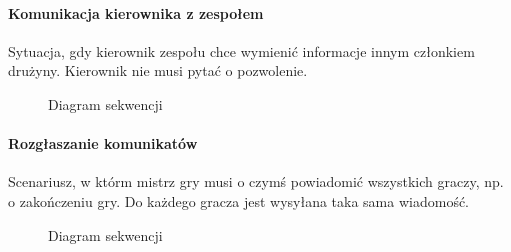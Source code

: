 \documentclass[11pt]{article}
\begin{document}
\paragraph{Komunikacja kierownika z zespołem}

Sytuacja, gdy kierownik zespołu chce wymienić informacje innym członkiem drużyny. Kierownik nie musi pytać o pozwolenie.

\begin{figure}[!h]
	\centering
	\caption{Diagram sekwencji}
\end{figure}
\FloatBarrier
\par

\paragraph{Rozgłaszanie komunikatów}

Scenariusz, w którm mistrz gry musi o czymś powiadomić wszystkich graczy, np. o zakończeniu gry. Do każdego gracza jest wysyłana taka sama wiadomość.

\begin{figure}[!h]
	\centering
	\caption{Diagram sekwencji}
\end{figure}
\FloatBarrier
\end{document}
